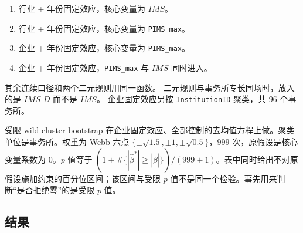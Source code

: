 \documentclass[11pt]{article}
\begin{document}
\begin{enumerate}
\item 行业 + 年份固定效应，核心变量为 \(IMS\)。
\item 行业 + 年份固定效应，核心变量为 \texttt{PIMS\_max}。
\item 企业 + 年份固定效应，核心变量为 \texttt{PIMS\_max}。
\item 企业 + 年份固定效应，\texttt{PIMS\_max} 与 \(IMS\) 同时进入。
\end{enumerate}

其余连续口径和两个二元规则用同一函数。
二元规则与事务所专长同场时，放入的是 \(IMS\_D\) 而不是 \(IMS\)。
企业固定效应另按 \texttt{InstitutionID} 聚类，共 96 个事务所。

受限 wild cluster bootstrap 在企业固定效应、全部控制的去均值方程上做。聚类单位是事务所。权重为 Webb 六点 \(\{\pm\sqrt{1.5},\pm 1,\pm\sqrt{0.5}\}\)，999 次，原假设是核心变量系数为 0。\(p\) 值等于 \((1+\#\{|\hat\beta^{*}|\ge|\hat\beta|\})/(999+1)\)。表中同时给出不对原假设施加约束的百分位区间；该区间与受限 \(p\) 值不是同一个检验。事先用来判断``是否拒绝零''的是受限 \(p\) 值。

\subsection{结果}
\end{document}
